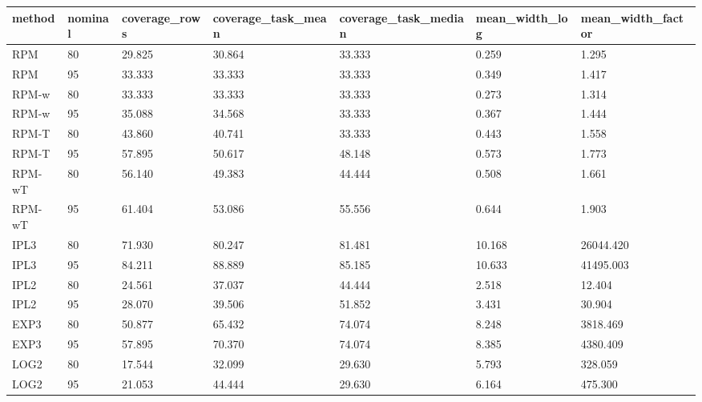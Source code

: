 \begin{tabular}{lllllll}
\hline
method & nominal & coverage\_rows & coverage\_task\_mean & coverage\_task\_median & mean\_width\_log & mean\_width\_factor \\
\hline
RPM & 80 & 29.825 & 30.864 & 33.333 & 0.259 & 1.295 \\
RPM & 95 & 33.333 & 33.333 & 33.333 & 0.349 & 1.417 \\
RPM-w & 80 & 33.333 & 33.333 & 33.333 & 0.273 & 1.314 \\
RPM-w & 95 & 35.088 & 34.568 & 33.333 & 0.367 & 1.444 \\
RPM-T & 80 & 43.860 & 40.741 & 33.333 & 0.443 & 1.558 \\
RPM-T & 95 & 57.895 & 50.617 & 48.148 & 0.573 & 1.773 \\
RPM-wT & 80 & 56.140 & 49.383 & 44.444 & 0.508 & 1.661 \\
RPM-wT & 95 & 61.404 & 53.086 & 55.556 & 0.644 & 1.903 \\
IPL3 & 80 & 71.930 & 80.247 & 81.481 & 10.168 & 26044.420 \\
IPL3 & 95 & 84.211 & 88.889 & 85.185 & 10.633 & 41495.003 \\
IPL2 & 80 & 24.561 & 37.037 & 44.444 & 2.518 & 12.404 \\
IPL2 & 95 & 28.070 & 39.506 & 51.852 & 3.431 & 30.904 \\
EXP3 & 80 & 50.877 & 65.432 & 74.074 & 8.248 & 3818.469 \\
EXP3 & 95 & 57.895 & 70.370 & 74.074 & 8.385 & 4380.409 \\
LOG2 & 80 & 17.544 & 32.099 & 29.630 & 5.793 & 328.059 \\
LOG2 & 95 & 21.053 & 44.444 & 29.630 & 6.164 & 475.300 \\
\hline
\end{tabular}
